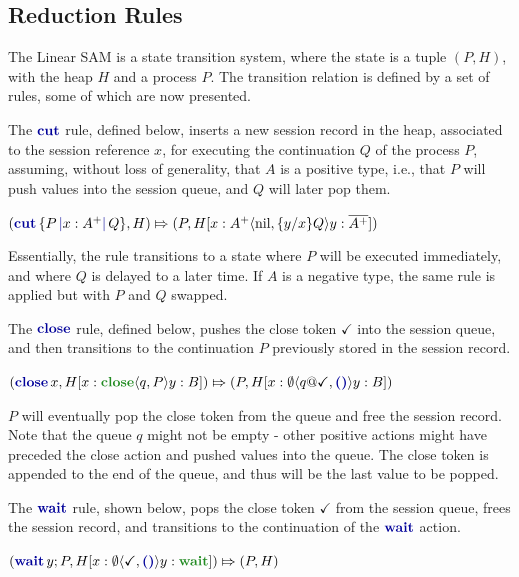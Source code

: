 \subsection{Reduction Rules}

The Linear \ac{SAM} is a state transition system, where the state is a tuple $(P, H)$, with the heap $H$ and a process $P$. The transition relation is defined by a set of rules, some of which are now presented.

The $\cutp$ rule, defined below, inserts a new session record in the heap, associated to the session reference $x$, for executing the continuation $Q$ of the process $P$, assuming, without loss of generality, that $A$ is a positive type, i.e., that $P$ will push values into the session queue, and $Q$ will later pop them.\\
\centerline{$
    (\cutc{P}{x: A^+}{Q}, H)
    \Mapsto
    (P, H[x: A^+\langle\text{nil},\{y/x\}Q\rangle y:\dual{A^+}])
$}
Essentially, the rule transitions to a state where $P$ will be executed immediately, and where $Q$ is delayed to a later time. If $A$ is a negative type, the same rule is applied but with $P$ and $Q$ swapped.

The $\closep$ rule, defined below, pushes the close token $\checkmark$ into the session queue, and then transitions to the continuation $P$ previously stored in the session record.\\
\centerline{$
        (\closec{x}, H[x:\closet\langle q, P\rangle y:B])
        \Mapsto
        (P,H[x:\emptyset\langle q@\checkmark, \emptyp\rangle y:B])
$}
$P$ will eventually pop the close token from the queue and free the session record. Note that the queue $q$ might not be empty - other positive actions might have preceded the close action and pushed values into the queue. The close token is appended to the end of the queue, and thus will be the last value to be popped.

The $\waitp$ rule, shown below, pops the close token $\checkmark$ from the session queue, frees the session record, and transitions to the continuation of the $\waitp$ action.\\   
\centerline{$
    (\waitc{y}P, H[x:\emptyset\langle\checkmark, \emptyp\rangle y:\waitt])
    \Mapsto
    (P,H)
$}

